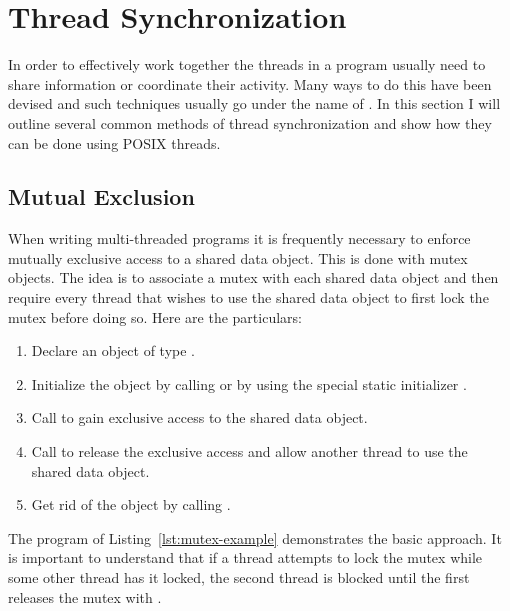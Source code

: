 
\section{Thread Synchronization}
\label{sec:thread-synchronization}

In order to effectively work together the threads in a program usually need to share information
or coordinate their activity. Many ways to do this have been devised and such techniques usually
go under the name of . In this section I will outline several
common methods of thread synchronization and show how they can be done using POSIX threads.

\subsection{Mutual Exclusion}
\label{subsec:mutual-exclusion}

When writing multi-threaded programs it is frequently necessary to enforce mutually exclusive
access to a shared data object. This is done with mutex objects. The idea is to associate a
mutex with each shared data object and then require every thread that wishes to use the shared
data object to first lock the mutex before doing so. Here are the particulars:

\begin{enumerate}

\item Declare an object of type .

\item Initialize the object by calling  or by using the special
  static initializer .
  
\item Call  to gain exclusive access to the shared data object.

\item Call  to release the exclusive access and allow another
  thread to use the shared data object.

\item Get rid of the object by calling .

\end{enumerate}

The program of Listing~\ref{lst:mutex-example} demonstrates the basic approach. It is important
to understand that if a thread attempts to lock the mutex while some other thread has it locked,
the second thread is blocked until the first releases the mutex with
.

